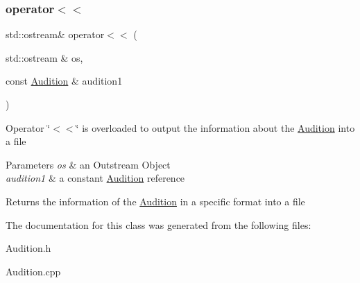 \subsubsection{\texorpdfstring{operator$<$$<$}{operator<<}}
{\footnotesize\ttfamily std\+::ostream\& operator$<$$<$ (\begin{DoxyParamCaption}\item[{std\+::ostream \&}]{os,  }\item[{const \hyperlink{class_audition}{Audition} \&}]{audition1 }\end{DoxyParamCaption})\hspace{0.3cm}{\ttfamily [friend]}}

Operator \char`\"{}$<$$<$\char`\"{} is overloaded to output the information about the \hyperlink{class_audition}{Audition} into a file 
\begin{DoxyParams}{Parameters}
{\em os} & an Outstream Object \\
\hline
{\em audition1} & a constant \hyperlink{class_audition}{Audition} reference \\
\hline
\end{DoxyParams}
\begin{DoxyReturn}{Returns}
the information of the \hyperlink{class_audition}{Audition} in a specific format into a file 
\end{DoxyReturn}


The documentation for this class was generated from the following files\+:\begin{DoxyCompactItemize}
\item 
Audition.\+h\item 
Audition.\+cpp\end{DoxyCompactItemize}
